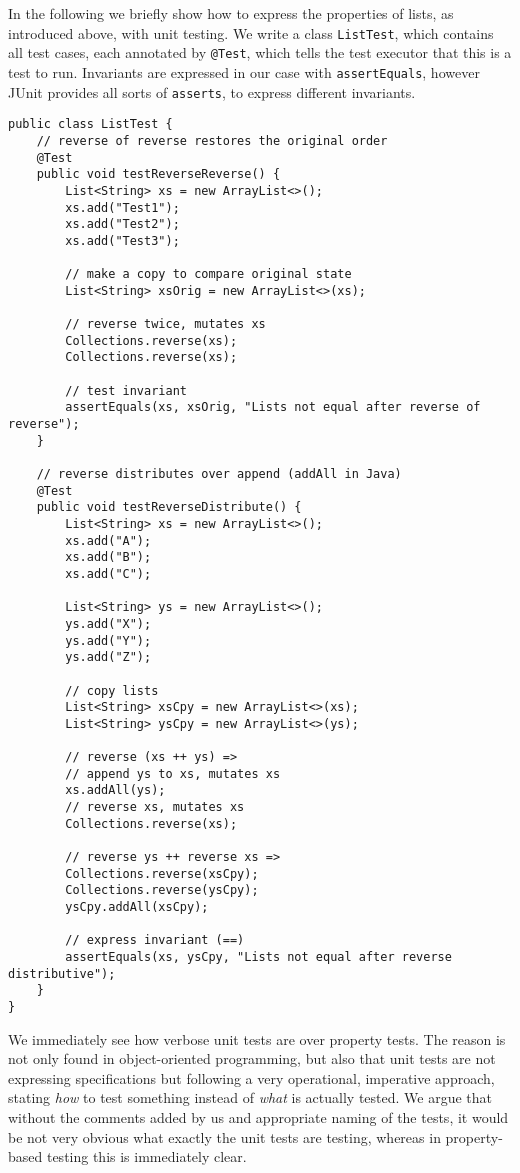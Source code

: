 In the following we briefly show how to express the properties of lists, as introduced above, with unit testing. We write a class \texttt{ListTest}, which contains all test cases, each annotated by \texttt{@Test}, which tells the test executor that this is a test to run. Invariants are expressed in our case with \texttt{assertEquals}, however JUnit provides all sorts of \texttt{asserts}, to express different invariants.

\begin{footnotesize}
\begin{verbatim}
public class ListTest {
    // reverse of reverse restores the original order
    @Test
    public void testReverseReverse() {
        List<String> xs = new ArrayList<>();
        xs.add("Test1");
        xs.add("Test2");
        xs.add("Test3");

        // make a copy to compare original state
        List<String> xsOrig = new ArrayList<>(xs);

        // reverse twice, mutates xs
        Collections.reverse(xs);
        Collections.reverse(xs);

        // test invariant
        assertEquals(xs, xsOrig, "Lists not equal after reverse of reverse");
    }

    // reverse distributes over append (addAll in Java)
    @Test
    public void testReverseDistribute() {
        List<String> xs = new ArrayList<>();
        xs.add("A");
        xs.add("B");
        xs.add("C");

        List<String> ys = new ArrayList<>();
        ys.add("X");
        ys.add("Y");
        ys.add("Z");

        // copy lists
        List<String> xsCpy = new ArrayList<>(xs);
        List<String> ysCpy = new ArrayList<>(ys);

        // reverse (xs ++ ys) =>
        // append ys to xs, mutates xs
        xs.addAll(ys);
        // reverse xs, mutates xs 
        Collections.reverse(xs);

        // reverse ys ++ reverse xs =>
        Collections.reverse(xsCpy);
        Collections.reverse(ysCpy);
        ysCpy.addAll(xsCpy);

        // express invariant (==)
        assertEquals(xs, ysCpy, "Lists not equal after reverse distributive");
    }
}
\end{verbatim}
\end{footnotesize}

We immediately see how verbose unit tests are over property tests. The reason is not only found in object-oriented programming, but also that unit tests are not expressing specifications but following a very operational, imperative approach, stating \textit{how} to test something instead of \textit{what} is actually tested. We argue that without the comments added by us and appropriate naming of the tests, it would be not very obvious what exactly the unit tests are testing, whereas in property-based testing this is immediately clear.

